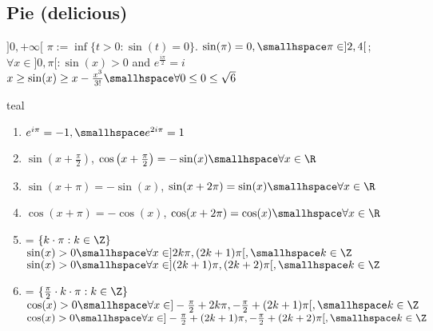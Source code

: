 \subsection{Pie (delicious)}
\shorttheorem {} $]0, +\infty[$ \trand $\pi := \inf\{ t > 0 : \sin(t) = 0\}$.
 $\sin(\pi) = 0, \smallhspace \pi \in ]2, 4[$; $\forall x \in ]0, \pi[ : \sin(x) > 0$ and $e^{\frac{i\pi}{2}} = i$
\shortcorollary $x \geq \sin(x) \geq x - \frac{x^3}{3!} \smallhspace \forall 0 \leq 0 \leq \sqrt{6}$ \shortcorollary
\begin{simplebox}[]{teal}
    \begin{multicols}{2}
        \begin{enumerate}
            \item $e^{i\pi} = -1, \smallhspace e^{2i \pi} = 1$
            \item $\sin\left( x + \frac{\pi}{2} \right)$, $\cos \left(x + \frac{\pi}{2}\right) = -\sin(x) \smallhspace \forall x \in \R$
            \item $\sin(x + \pi) = -\sin(x)$, $\sin(x + 2\pi) = \sin(x) \smallhspace \forall x \in \R$
            \item $\cos(x + \pi) = -\cos(x)$, $\cos(x + 2\pi) = \cos(x) \smallhspace \forall x \in \R$
        \end{enumerate}
    \end{multicols}
    \vspace{-1.8pc}
    \begin{multicols}{2}
        \begin{enumerate}
            \setcounter{enumi}{4}
            \item {} = $\{ k \cdot \pi : k \in \Z \}$\\
                  $\sin(x) > 0 \smallhspace \forall x \in ]2k\pi, (2k + 1)\pi[, \smallhspace k \in \Z$
                  $\sin(x) > 0 \smallhspace \forall x \in ](2k + 1)\pi, (2k + 2)\pi[, \smallhspace k \in \Z$
            \item {} = $\{ \frac{\pi}{2} \cdot k \cdot \pi : k \in \Z \}$\\
                  $\cos(x) > 0 \smallhspace \forall x \in ]-\frac{\pi}{2} + 2k\pi, -\frac{\pi}{2} + (2k + 1)\pi[, \smallhspace k \in \Z$
                  $\cos(x) > 0 \smallhspace \forall x \in ]-\frac{\pi}{2} + (2k + 1)\pi, -\frac{\pi}{2} + (2k + 2)\pi[, \smallhspace k \in \Z$
        \end{enumerate}
    \end{multicols}
\end{simplebox}


